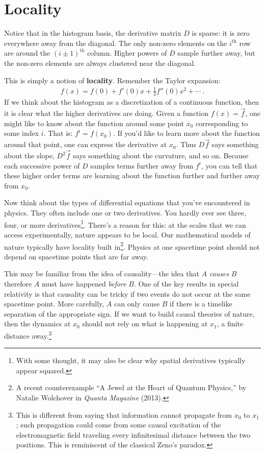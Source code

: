 \documentclass[
  11pt,
	colorful,
	raggedright,
]{tufte-style-thesis-flip}
\begin{document}
\section{Locality}

Notice that in the histogram basis, the derivative matrix $D$ is sparse: it is zero everywhere away from the diagonal. The only non-zero elements on the $i^\text{th}$ row are around the $(i\pm 1)^\text{th}$ column.  Higher powers of $D$ sample further away, but the non-zero elements are always clustered near the diagonal.

This is simply a notion of \textbf{locality}. Remember the Taylor expansion:
\begin{align}
  f(x) = f(0) + f'(0) x + \frac{1}{2} f''(0)x^2 + \cdots \ .
\end{align}
If we think about the histogram as a discretization of a continuous function, then it is clear what the higher derivatives are doing. Given a function $f(x) = \vec{f}$, one might like to know about the function around some point $x_0$ corresponding to some index $i$. That is: $f^i = f(x_0)$. If you’d like to learn more about the function around that point, one can express the derivative at $x_0$. Thus $D\vec{f}$ says something about the slope, $D^2\vec{f}$ says something about the curvature, and so on. Because each successive power of $D$ samples terms further away from $f^i$, you can tell that these higher order terms are learning about the function further and further away from $x_0$. 

Now think about the types of differential equations that you’ve encountered in physics. They often include one or two derivatives. You hardly ever see three, four, or more derivatives\footnote{With some thought, it may also be clear why spatial derivatives typically appear squared.}. There’s a reason for this: at the scales that we can access experimentally, nature appears to be local. Our mathematical models of nature typically have locality built in\footnote{A recent counterexample ``A Jewel at the Heart of Quantum Physics,'' by Natalie Wolchover in \emph{Quanta Magazine} (2013).
}. Physics at one spacetime point should not depend on spacetime points that are far away. 

This may be familiar from the idea of causality---the idea that $A$ \emph{causes} $B$ therefore $A$ must have happened \emph{before} $B$. One of the key results in special relativity is that causality can be tricky if two events do not occur at the same spacetime point. More carefully, $A$ can only cause $B$ if there is a timelike separation of the appropriate sign.  If we want to build causal theories of nature, then the dynamics at $x_0$ should not rely on what is happening at $x_1$, a finite distance away.\footnote{This is different from saying that information cannot propagate from $x_0$ to $x_1$; such propagation could come from some causal excitation of the electromagnetic field traveling every infinitesimal distance between the two positions. This is reminiscent of the classical Zeno's paradox.}
\end{document}
